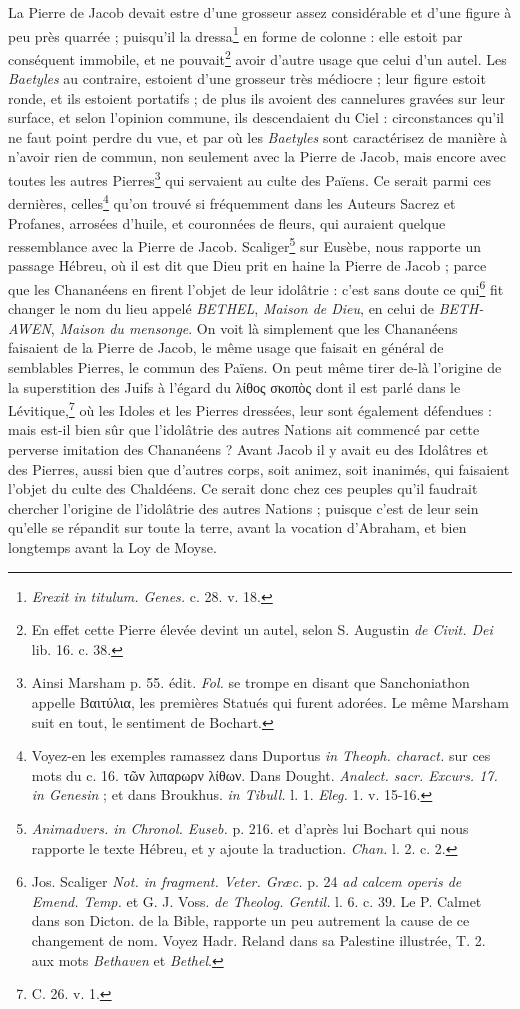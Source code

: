 \documentclass[a4paper, 11pt, oneside, polutonikogreek, french]{article}
\begin{document}
La Pierre de Jacob devait estre d'une grosseur assez considérable et d'une figure à peu près quarrée ; puisqu'il la dressa\footnote{\emph{Erexit in titulum. Genes.} c. 28. v. 18.} en forme de colonne : elle estoit par conséquent immobile, et ne pouvait\footnote{En effet cette Pierre élevée devint un autel, selon S. Augustin \emph{de Civit. Dei} lib. 16. c. 38.} avoir d'autre usage que celui d'un autel. Les \emph{Baetyles} au contraire, estoient d'une grosseur très médiocre ; leur figure estoit ronde, et ils estoient portatifs ; de plus ils avoient des cannelures gravées sur leur surface, et selon l'opinion commune, ils descendaient du Ciel : circonstances qu'il ne faut point perdre du vue, et par où les \emph{Baetyles} sont caractérisez de manière à n'avoir rien de commun, non seulement avec la Pierre de Jacob, mais encore avec toutes les autres Pierres\footnote{Ainsi Marsham p. 55. édit. \emph{Fol.} se trompe en disant que Sanchoniathon appelle Βαιτύλια, les premières Statués qui furent adorées. Le même Marsham suit en tout, le sentiment de Bochart.} qui servaient au culte des Païens. Ce serait parmi ces dernières, celles\footnote{Voyez-en les exemples ramassez dans Duportus \emph{in Theoph. charact.} sur ces mots du c. 16. τῶν λιπαρωρν λίθων. Dans Dought. \emph{Analect. sacr. Excurs. 17. in Genesin} ; et dans Broukhus. \emph{in Tibull.} l. 1. \emph{Eleg.} 1. v. 15-16.} qu'on trouvé si fréquemment dans les Auteurs Sacrez et Profanes, arrosées d'huile, et couronnées de fleurs, qui auraient quelque ressemblance avec la Pierre de Jacob. Scaliger\footnote{\emph{Animadvers. in Chronol. Euseb.} p. 216. et d'après lui Bochart qui nous rapporte le texte Hébreu, et y ajoute la traduction. \emph{Chan.} l. 2. c. 2.} sur Eusèbe, nous rapporte un passage Hébreu, où il est dit que Dieu prit en haine la Pierre de Jacob ; parce que les Chananéens en firent l'objet de leur idolâtrie : c'est sans doute ce qui\footnote{Jos. Scaliger \emph{Not. in fragment. Veter. Græc.} p. 24 \emph{ad calcem operis de Emend. Temp.} et G. J. Voss. \emph{de Theolog. Gentil.} l. 6. c. 39. Le P. Calmet dans son Dicton. de la Bible, rapporte un peu autrement la cause de ce changement de nom. Voyez Hadr. Reland dans sa Palestine illustrée, T. 2. aux mots \emph{Bethaven} et \emph{Bethel}.} fit changer le nom du lieu appelé \emph{BETHEL}, \emph{Maison de Dieu}, en celui de \emph{BETH-AWEN}, \emph{Maison du mensonge}. On voit là simplement que les Chananéens faisaient de la Pierre de Jacob, le même usage que faisait en général de semblables Pierres, le commun des Païens. On peut même tirer de-là l'origine de la superstition des Juifs à l'égard du λίθος σκοπὸς dont il est parlé dans le Lévitique,\footnote{C. 26. v. 1.} où les Idoles et les Pierres dressées, leur sont également défendues : mais est-il bien sûr que l'idolâtrie des autres Nations ait commencé par cette perverse imitation des Chananéens ? Avant Jacob il y avait eu des Idolâtres et des Pierres, aussi bien que d'autres corps, soit animez, soit inanimés, qui faisaient l'objet du culte des Chaldéens. Ce serait donc chez ces peuples qu'il faudrait chercher l'origine de l'idolâtrie des autres Nations ; puisque c'est de leur sein qu'elle se répandit sur toute la terre, avant la vocation d'Abraham, et bien longtemps avant la Loy de Moyse.
\end{document}
